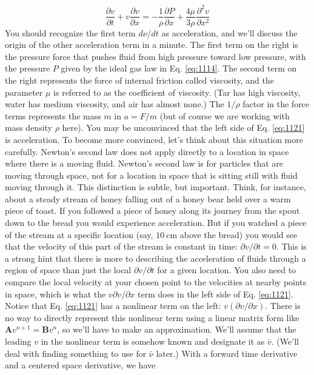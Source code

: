 \begin{equation}\label{eq:1121}
\frac{\partial v}{\partial t}+v \frac{\partial v}{\partial x}=-\frac{1}{\rho} \frac{\partial P}{\partial x}+\frac{4 \mu}{3 \rho} \frac{\partial^{2} v}{\partial x^{2}}
\end{equation}
You should recognize the first term $d \nu / d t$ as acceleration, and we\rq ll discuss the origin of the other acceleration term in a minute. The first term on the right is the pressure force that pushes fluid from high pressure toward low pressure, with the pressure $P$ given by the ideal gas law in Eq. \eqref{eq:1114}. The second term on the right represents the force of internal friction called viscosity, and the parameter $\mu$ is referred to as the coefficient of viscosity. (Tar has high viscosity, water has medium viscosity, and air has almost none.) The $1 / \rho$ factor in the force terms represents the mass $m$ in $a=F / m$ (but of course we are working with mass density $\rho$ here).
You may be unconvinced that the left side of Eq. \eqref{eq:1121} is acceleration. To become more convinced, let\rq s think about this situation more carefully. Newton\rq s second law does not apply directly to a location in space where there is a moving fluid. Newton\rq s second law is for particles that are moving through space, not for a location in space that is sitting still with fluid moving through it. This distinction is subtle, but important. Think, for instance, about a steady stream of honey falling out of a honey bear held over a warm piece of toast. If you followed a piece of honey along its journey from the spout down to the bread you would experience acceleration. But if you watched a piece of the stream at a specific location (say, $10 \mathrm{~cm}$ above the bread) you would see that the velocity of this part of the stream is constant in time: $\partial v / \partial t=0$. This is a strong hint that there is more to describing the acceleration of fluids through a region of space than just the local $\partial v / \partial t$ for a given location. You also need to compare the local velocity at your chosen point to the velocities at nearby points in space, which is what the $v \partial v / \partial x$ term does in the left side of Eq. \eqref{eq:1121}.
Notice that Eq. \eqref{eq:1121} has a nonlinear term on the left: $v(\partial v / \partial x)$. There is no way to directly represent this nonlinear term using a linear matrix form like $\mathbf{A} v^{n+1}=\mathbf{B} v^{n}$, so we'll have to make an approximation. We\rq ll assume that the leading $v$ in the nonlinear term is somehow known and designate it as $\bar{v}$. (We\rq ll deal with finding something to use for $\bar{\nu}$ later.) With a forward time derivative and a centered space derivative, we have


